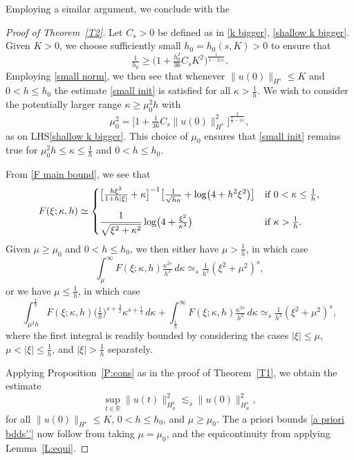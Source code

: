 \documentclass{amsart}
\newcommand{\R}{{\mathbb{R}}}
\theoremstyle{definition}
\theoremstyle{remark}
\begin{document}
Employing a similar argument, we conclude with the

\begin{proof}[Proof of Theorem~\ref{T2}]
Let \(C_s>0\) be defined as in \eqref{k bigger}, \eqref{shallow k bigger}. Given \(K>0\), we choose sufficiently small \(h_0 = h_0(s,K)>0\) to ensure that
\[
\tfrac1{h_0}\geq \bigl(1 + \tfrac{h_0^2}{36}C_sK^2\bigr)^{\frac1{1-2|s|}}.
\]
Employing \eqref{small norm}, we then see that whenever \(\|u(0)\|_{H^s}\leq K\) and \(0<h\leq h_0\) the estimate \eqref{small init} is satisfied for all \(\kappa>\frac1h\).  We wish to consider the potentially larger range $\kappa\geq \mu_0^2h$ with
\[
\mu_0^2 = \bigl[ 1 + \tfrac1{36} C_s \|u(0)\|_{H^s}^2 \bigr]^{\frac{1}{\frac32-|s|}},
\]
as on LHS\eqref{shallow k bigger}.  This choice of $\mu_0$ ensures that  \eqref{small init} remains true for $\mu_0^2h\leq\kappa\leq \frac1h$ and  \(0<h\leq h_0\).

From \eqref{F main bound}, we see that
\[
F(\xi;\kappa,h)\simeq \begin{cases}\displaystyle\bigl[\tfrac{h\xi^2}{1+h|\xi|} +\kappa\bigr]^{-1}\bigl[\tfrac{1}{\sqrt{h\kappa}}+ \log\bigl(4 + h^2\xi^2\bigr)\bigr]&\text{if \(0<\kappa\leq \frac1h\),}\vspace{1em}\\\displaystyle\frac1{\sqrt{\xi^2 + \kappa^2}}\log\bigl(4 + \tfrac{\xi^2}{\kappa^2}\bigr)&\text{if \(\kappa>\frac1h\).}\end{cases}
\]
Given \(\mu\geq \mu_0\) and \(0<h\leq h_0\), we then either have \(\mu > \frac1h\), in which case
\[
\int_\mu^\infty F(\xi;\kappa,h)\tfrac{\kappa^{2s}}{h^2}\,d\kappa\simeq_s \tfrac1{h^2}(\xi^2 + \mu^2)^s,
\]
or we have \(\mu\leq \frac1h\), in which case
\[
\int_{\mu^2h}^{\frac1{h}} F(\xi;\kappa,h) \bigl(\tfrac1 h\bigr)^{s+\frac32} \kappa^{s+\frac12} \,d\kappa + \int_{\frac1{h}}^\infty F(\xi;\kappa,h) \tfrac{\kappa^{2s}}{h^2} \,d\kappa \simeq_s \tfrac1{h^2}(\xi^2 + \mu^2)^{s},
\]
where the first integral is readily bounded by considering the cases \(|\xi|\leq \mu\), \(\mu<|\xi|\leq \frac1h\), and \(|\xi|>\frac1h\) separately.

Applying Proposition~\ref{P:cons} as in the proof of Theorem~\ref{T1}, we obtain the estimate
\[
\sup_{t\in \R}\|u(t)\|_{H_\mu^s}^2\lesssim_s \|u(0)\|_{H_\mu^s}^2,
\]
for all \(\|u(0)\|_{H^s}\leq K\), \(0<h\leq h_0\), and \(\mu\geq \mu_0\). The a priori bounds \eqref{a priori bdds''} now follow from taking \(\mu =\mu_0\), and the equicontinuity from applying Lemma~\ref{L:equi}.
\end{proof}
\end{document}
